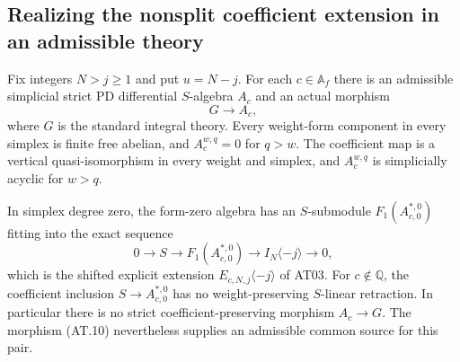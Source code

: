 \subsection{Realizing the nonsplit coefficient extension in an admissible theory}

\begin{theorem}
\label{AT09}
Fix integers $N>j\geq1$ and put $u=N-j$.
For each $c\in\mathbb A_f$ there is an admissible
simplicial strict PD differential $S$-algebra $A_c$
and an actual morphism
\[
 G\longrightarrow A_c,
 \tag{AT.10}
\]
where $G$ is the standard integral theory.
Every weight-form component in every simplex is finite
free abelian, and $A_c^{w,q}=0$ for $q>w$.
The coefficient map is a vertical quasi-isomorphism
in every weight and simplex, and $A_c^{w,q}$ is
simplicially acyclic for $w>q$.

In simplex degree zero, the form-zero algebra has an
$S$-submodule $F_1(A_{c,0}^{*,0})$ fitting into the
exact sequence
\[
 0\longrightarrow S\longrightarrow
 F_1(A_{c,0}^{*,0})\longrightarrow
 I_N\langle-j\rangle\longrightarrow0,
 \tag{AT.11}
\]
which is the shifted explicit extension
$E_{c,N,j}\langle-j\rangle$ of AT03.
For $c\notin\mathbb Q$, the coefficient inclusion
$S\to A_{c,0}^{*,0}$ has no weight-preserving
$S$-linear retraction. In particular there is no
strict coefficient-preserving morphism $A_c\to G$.
The morphism (AT.10) nevertheless supplies an
admissible common source for this pair.
\end{theorem}

